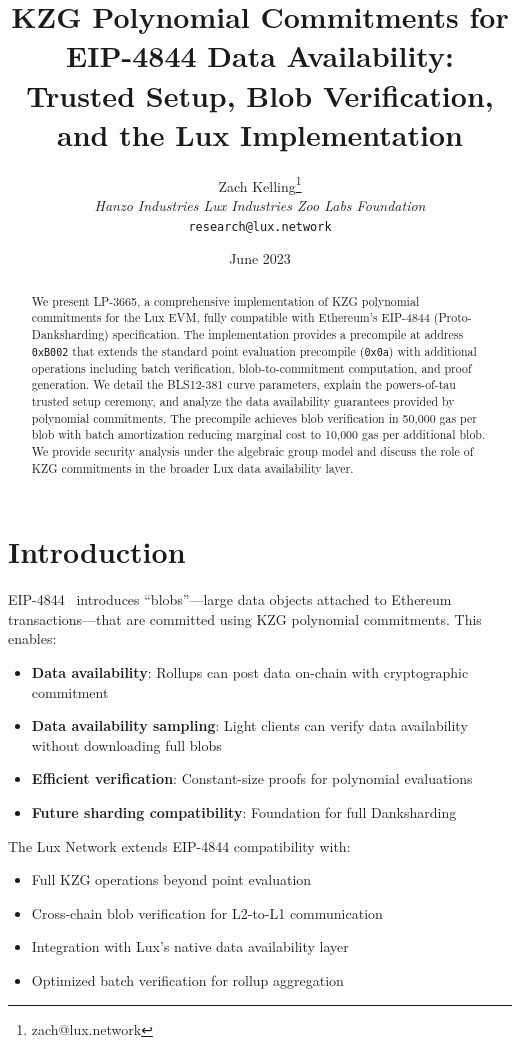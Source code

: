 \documentclass[11pt,a4paper]{article}
\title{KZG Polynomial Commitments for EIP-4844 Data Availability:\\Trusted Setup, Blob Verification, and the Lux Implementation}
\author{Zach Kelling\thanks{zach@lux.network} \\ \textit{Hanzo Industries \quad Lux Industries \quad Zoo Labs Foundation} \\ \texttt{research@lux.network}}
\date{June 2023}
\theoremstyle{definition}
\begin{document}
\maketitle

\begin{abstract}
We present LP-3665, a comprehensive implementation of KZG polynomial commitments for the Lux EVM, fully compatible with Ethereum's EIP-4844 (Proto-Danksharding) specification. The implementation provides a precompile at address \texttt{0xB002} that extends the standard point evaluation precompile (\texttt{0x0a}) with additional operations including batch verification, blob-to-commitment computation, and proof generation. We detail the BLS12-381 curve parameters, explain the powers-of-tau trusted setup ceremony, and analyze the data availability guarantees provided by polynomial commitments. The precompile achieves blob verification in 50,000 gas per blob with batch amortization reducing marginal cost to 10,000 gas per additional blob. We provide security analysis under the algebraic group model and discuss the role of KZG commitments in the broader Lux data availability layer.
\end{abstract}

\section{Introduction}

EIP-4844~\cite{eip4844} introduces ``blobs''---large data objects attached to Ethereum transactions---that are committed using KZG polynomial commitments. This enables:

\begin{itemize}
    \item \textbf{Data availability}: Rollups can post data on-chain with cryptographic commitment
    \item \textbf{Data availability sampling}: Light clients can verify data availability without downloading full blobs
    \item \textbf{Efficient verification}: Constant-size proofs for polynomial evaluations
    \item \textbf{Future sharding compatibility}: Foundation for full Danksharding
\end{itemize}

The Lux Network extends EIP-4844 compatibility with:
\begin{itemize}
    \item Full KZG operations beyond point evaluation
    \item Cross-chain blob verification for L2-to-L1 communication
    \item Integration with Lux's native data availability layer
    \item Optimized batch verification for rollup aggregation
\end{itemize}
\end{document}
